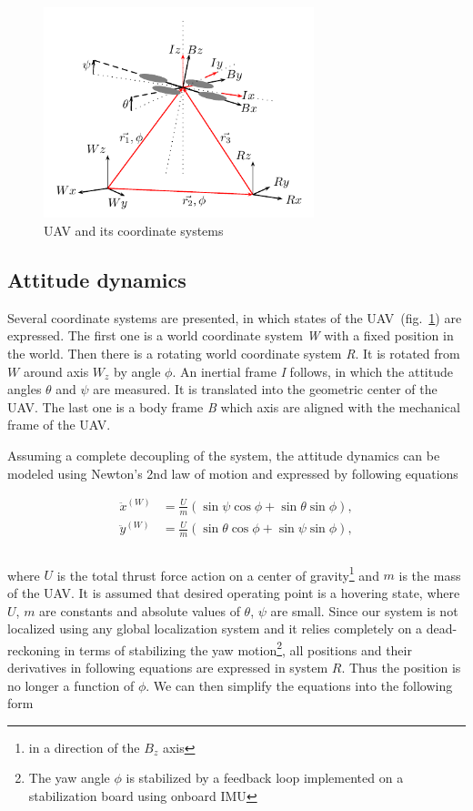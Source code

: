 \begin{figure}[!h]
\centering
\includegraphics[width=0.7\textwidth]{fig/coordinate_system.pdf}
\caption{UAV and its coordinate systems}
\label{fig:coordinate_system}
\end{figure}

\subsection{Attitude dynamics}

Several coordinate systems are presented, in which states of the UAV~(fig.~\ref{fig:coordinate_system}) are expressed. The first one is a world coordinate system \textit{W} with a fixed position in the world. Then there is a rotating world coordinate system \textit{R}. It is rotated from $W$ around axis $W_z$ by angle $\phi$. An inertial frame \textit{I} follows, in which the attitude angles $\theta$ and $\psi$ are measured. It is translated into the geometric center of the UAV. The last one is a body frame \textit{B} which axis are aligned with the mechanical frame of the UAV.

Assuming a complete decoupling of the system, the attitude dynamics can be modeled using Newton's 2nd law of motion and expressed by following equations

\begin{equation}
\begin{split}
\ddot{x}^{(W)} &= \frac{U}{m}\left(\sin\psi\cos\phi + \sin\theta\sin\phi\right),\\
\ddot{y}^{(W)} &= \frac{U}{m}\left(\sin\theta\cos\phi + \sin\psi\sin\phi\right),\\
\end{split}
\end{equation}
\\
where $U$ is the total thrust force action on a center of gravity\footnote{in a direction of the $B_z$ axis} and $m$ is the mass of the UAV. It is assumed that desired operating point is a hovering state, where $U$, $m$ are constants and absolute values of $\theta$, $\psi$ are small. Since our system is not localized using any global localization system and it relies completely on a dead-reckoning in terms of stabilizing the yaw motion\footnote{The yaw angle $\phi$ is stabilized by a feedback loop implemented on a stabilization board using onboard IMU}, all positions and their derivatives in following equations are expressed in system $R$. Thus the position is no longer a function of $\phi$. We can then simplify the equations into the following form

